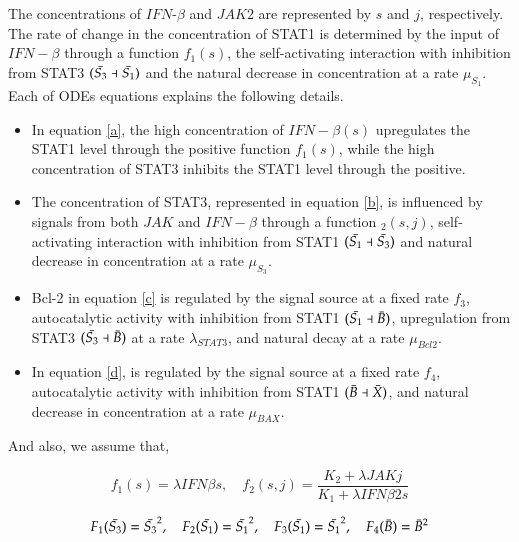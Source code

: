 \newpage

The concentrations of $IFN$-$\beta$ and $JAK2$ are represented by $s$ and $j$, respectively. The rate of change in the concentration of STAT1 is determined by the input of $IFN-\beta$ through a function $f_1(s)$, the self-activating interaction with inhibition from STAT3 $(\Bar{S_3} \dashv \Bar{S_1})$ and the natural decrease in concentration at a rate $\mu_{S_1}$.  Each of ODEs equations explains the following details. 

\begin{itemize}
    \item In equation \eqref{a}, the high concentration of $IFN-\beta(s)$ upregulates the STAT1 level through the positive
function $f_1(s)$, while the high concentration of STAT3 inhibits the STAT1 level through the positive. 

\item The concentration of STAT3, represented in equation \eqref{b}, is influenced by signals from both $JAK$ and $IFN-\beta$ through a function $_2(s,j)$, self-activating interaction with inhibition from STAT1 $(\Bar{S_1} \dashv \Bar{S_3})$ and natural decrease in concentration at a rate $\mu_{S_3}$.

\item  Bcl-2 in equation \eqref{c} is regulated by the signal source at a fixed rate $f_3$, autocatalytic activity with inhibition from STAT1 $(\Bar{S_1} \dashv \Bar{B})$, upregulation from STAT3 $(\Bar{S_3} \dashv \Bar{B})$ at a rate $\lambda_{STAT3}$, and natural decay at a rate $\mu_{Bcl2}$.

\item In equation \eqref{d}, is regulated by the signal source at
a fixed rate $f_4$,  autocatalytic activity with inhibition from STAT1 $(\Bar{B} \dashv \Bar{X})$, and natural decrease in concentration at a rate $\mu_{BAX}$.
\end{itemize}

And also, we assume that, 

\begin{equation}
       f_1(s)=\lambda{IFN\beta s} , \quad    f_2(s,j)=\frac{K_2+\lambda{JAK}j}{K_1+\lambda{IFN\beta2s}}
\end{equation}

\begin{equation}
         F_1(\Bar{S_3})={\Bar{S_3}}^2 , \quad       F_2(\Bar{S_1})={\Bar{S_1}}^2, \quad  F_3(\Bar{S_1})={\Bar{S_1}}^2, \quad    F_4(\Bar{B})={\Bar{B}}^2
\end{equation}

